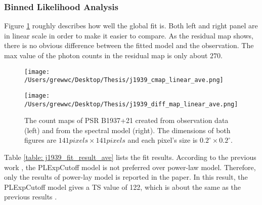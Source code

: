\documentclass[12pt]{report}
\begin{document}
          \subsubsection{Binned Likelihood Analysis}
            Figure \ref{fig: j1939_count_map_diff_ave} roughly describes how well the global fit 
            is. Both left and right panel are in linear scale in order to make it easier to 
            compare. As the residual map shows, there is no obvious difference between the fitted 
            model and the observation. The max value of the photon counts in the residual map 
            is only about $270$. 
            \begin{figure}[!ht]
              \begin{center}
              \begin{minipage}{0.45\textwidth}
                \begin{center} 
                  \texttt{[image: /Users/grewwc/Desktop/Thesis/j1939\_cmap\_linear\_ave.png]}
                \end{center}
              \end{minipage}
              \begin{minipage}{0.45\textwidth}
                \begin{center}
                  \texttt{[image: /Users/grewwc/Desktop/Thesis/j1939\_diff\_map\_linear\_ave.png]}
                \end{center}
              \end{minipage}
              \end{center}

              \caption{The count maps of PSR B1937+21 created from observation 
                data (\textsf{left}) and from the spectral model (\textsf{right}). The dimensions
                of both figures are $141 pixels \times 141 pixels$ and each pixel's size is
                $0.2^{\circ}\times0.2^{\circ}$.}
              \label{fig: j1939_count_map_diff_ave}
            \end{figure}

            Table \ref{table: j1939_fit_result_ave} lists the fit results. According to the 
            previous work \cite{0004-637X-787-2-167}, the PLExpCutoff model is not 
            preferred over power-law model. Therefore, only the results of power-lay model is 
            reported in the paper. In this result, the PLExpCutoff model gives a TS value of 122,
            which is about the same as the previous results \cite{0004-637X-787-2-167}. 
\end{document}
